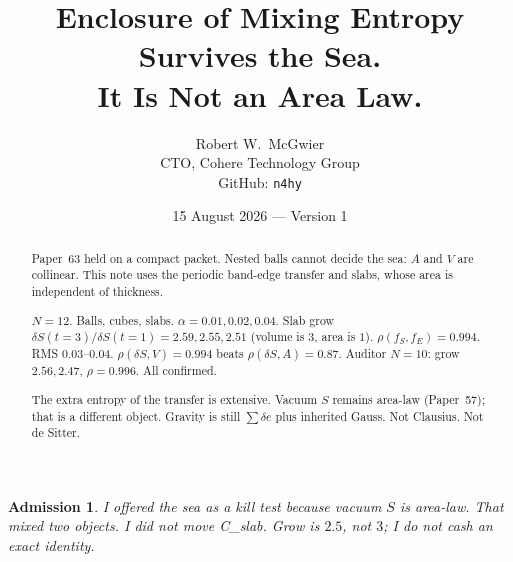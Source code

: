 \documentclass[11pt]{article}
\title{\textbf{Enclosure of Mixing Entropy Survives the Sea.\\
It Is Not an Area Law.}}
\author{Robert W.\ McGwier\\
\small CTO, Cohere Technology Group\\
\small GitHub: \texttt{n4hy}}
\date{15 August 2026 --- Version 1}
\newtheorem*{admission}{Admission}
\begin{document}
\maketitle

\begin{abstract}
\noindent
Paper~63 held on a compact packet. Nested balls cannot
decide the sea: $A$ and $V$ are collinear. This note
uses the periodic band-edge transfer and slabs, whose
area is independent of thickness.

$N=12$. Balls, cubes, slabs. $\alpha=0.01,0.02,0.04$.
Slab grow $\delta S(t{=}3)/\delta S(t{=}1)=2.59,2.55,2.51$
(volume is $3$, area is $1$).
$\rho(f_S,f_E)=0.994$. RMS $0.03$--$0.04$.
$\rho(\delta S,V)=0.994$ beats $\rho(\delta S,A)=0.87$.
Auditor $N=10$: grow $2.56,2.47$, $\rho=0.996$.
All confirmed.

The extra entropy of the transfer is extensive.
Vacuum $S$ remains area-law (Paper~57); that is a
different object. Gravity is still $\sum\delta e$ plus
inherited Gauss. Not Clausius. Not de Sitter.
\end{abstract}

\begin{admission}
I offered the sea as a kill test because vacuum $S$ is
area-law. That mixed two objects. I did not move
C\_slab. Grow is $2.5$, not $3$; I do not cash an exact
identity.
\end{admission}
\end{document}
